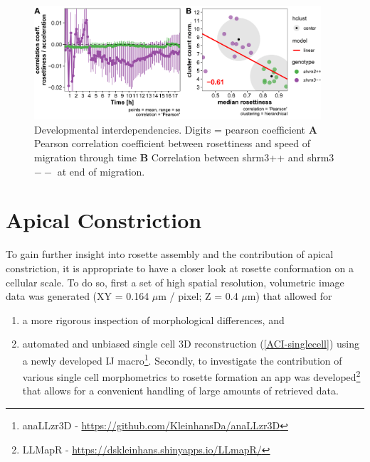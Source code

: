 \documentclass[11pt,singlespacinge,twoside]{reedthesis} %
\providecommand{\tightlist}{%
  \setlength{\itemsep}{0pt}\setlength{\parskip}{0pt}}
\begin{document}
\begin{figure}

{\centering \includegraphics[width=0.95\textwidth]{figures/results/03_rosettes/rdt_corr_speed-ros} 

}

\caption[Developmental interdependencies]{Developmental interdependencies. Digits = pearson coefficient \textbf{A} Pearson correlation coefficient between rosettiness and speed of migration through time \textbf{B} Correlation between shrm3++ and shrm3\(--\) at end of migration.}\label{fig:rdtcorr}
\end{figure}
\hypertarget{apical-constriction-1}{%
\section{Apical Constriction}\label{apical-constriction-1}}

To gain further insight into rosette assembly and the contribution of apical constriction, it is appropriate to have a closer look at rosette conformation on a cellular scale. To do so, first a set of high spatial resolution, volumetric image data was generated (XY = 0.164 \(\mu\)m / pixel; Z = 0.4 \(\mu\)m) that allowed for
\begin{enumerate}
\def\labelenumi{\arabic{enumi}.}
\tightlist
\item
  a more rigorous inspection of morphological differences, and
\item
  automated and unbiased single cell 3D reconstruction (\ref{ACI-singlecell}) using a newly developed IJ macro\footnote{anaLLzr3D - \url{https://github.com/KleinhansDa/anaLLzr3D}}. Secondly, to investigate the contribution of various single cell morphometrics to rosette formation an app was developed\footnote{LLMapR - \url{https://dskleinhans.shinyapps.io/LLmapR/}} that allows for a convenient handling of large amounts of retrieved data.
\end{enumerate}
\end{document}
